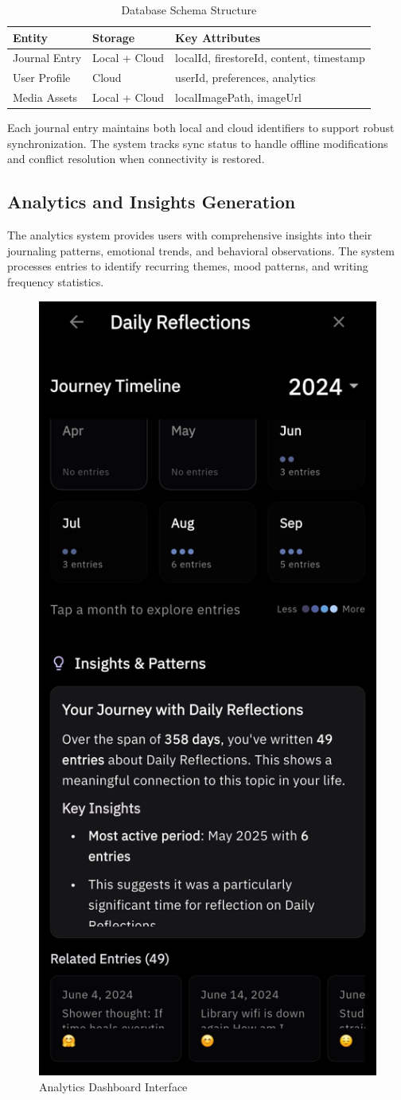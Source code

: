 \documentclass[conference]{IEEEtran}
\begin{document}
\begin{table}[H]
\centering
\caption{Database Schema Structure}
\label{tab:database-schema}
\begin{tabular}{|p{2cm}|p{2.5cm}|p{3cm}|}
\hline
\textbf{Entity} & \textbf{Storage} & \textbf{Key Attributes} \\
\hline
Journal Entry & Local + Cloud & localId, firestoreId, content, timestamp \\
\hline
User Profile & Cloud & userId, preferences, analytics \\
\hline
Media Assets & Local + Cloud & localImagePath, imageUrl \\
\hline
\end{tabular}
\end{table}

Each journal entry maintains both local and cloud identifiers to support robust synchronization. The system tracks sync status to handle offline modifications and conflict resolution when connectivity is restored.

\subsection{Analytics and Insights Generation}

The analytics system provides users with comprehensive insights into their journaling patterns, emotional trends, and behavioral observations. The system processes entries to identify recurring themes, mood patterns, and writing frequency statistics.

\begin{figure}[H]
\centering
\includegraphics[width=0.45\columnwidth]{analytics_screen.jpeg}
\caption{Analytics Dashboard Interface}
\label{fig:analytics-dashboard}
\end{figure}
\end{document}
